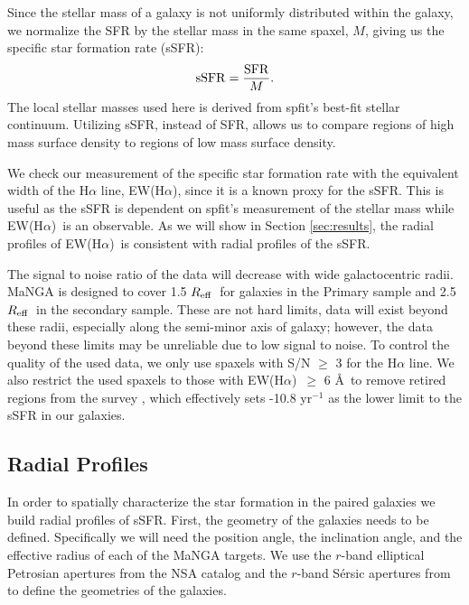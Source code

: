 \documentclass[apj,twocolumn]{emulateapj}
\newcommand{\reff}{$R_{\rm eff}$}
\newcommand{\ewha}{EW(H$\alpha$)}
\begin{document}
\begin{CJK*}{UTF8}{gbsn}
Since the stellar mass of a galaxy is not uniformly distributed within the galaxy, we normalize the SFR by the stellar mass in the same spaxel, $M$, giving us the specific star formation rate (sSFR):
\begin{equation}
{\rm sSFR} = \frac{\rm SFR}{M}.
\end{equation}
The local stellar masses used here is derived from {\sc spfit}'s best-fit stellar continuum. Utilizing sSFR, instead of SFR, allows us to compare regions of high mass surface density to regions of low mass surface density. 

We check our measurement of the specific star formation rate with the equivalent width of the H$\alpha$ line, \ewha, since it is a known proxy for the sSFR. This is useful as the sSFR is dependent on {\sc spfit}'s measurement of the stellar mass while \ewha\ is an observable. As we will show in Section \ref{sec:results}, the radial profiles of \ewha\ is consistent with radial profiles of the sSFR.

The signal to noise ratio of the data will decrease with wide galactocentric radii. MaNGA is designed to cover 1.5 \reff\ for galaxies in the Primary sample and 2.5 \reff\ in the secondary sample. These are not hard limits, data will exist beyond these radii, especially along the semi-minor axis of galaxy; however, the data beyond these limits may be unreliable due to low signal to noise. To control the quality of the used data, we only use spaxels with S/N $\ge$ 3 for the H$\alpha$ line. We also restrict the used spaxels to those with \ewha\ $\ge$ 6 \AA\ to remove retired regions from the survey \citep{Cid-Fernandes:2011}, which effectively sets -10.8 yr$^{-1}$ as the lower limit to the sSFR in our galaxies.

\subsection{Radial Profiles}\label{sec:radial}

In order to spatially characterize the star formation in the paired galaxies we build radial profiles of sSFR. First, the geometry of the galaxies needs to be defined. Specifically we will need the position angle, the inclination angle, and the effective radius of each of the MaNGA targets. We use the $r$-band elliptical Petrosian apertures from the NSA catalog and the $r$-band S\'ersic apertures from \citet{Simard:2011} to define the geometries of the galaxies. 


\end{CJK*}
\end{document}

